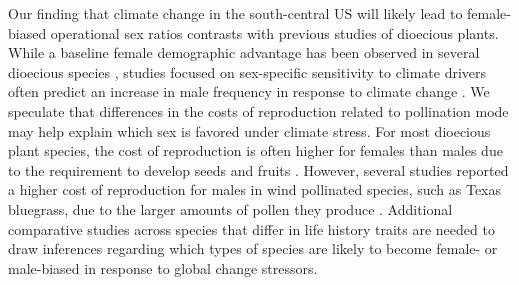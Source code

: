 \documentclass[9pt,twocolumn,twoside,lineno]{pnas-new}
\begin{document}
Our finding that climate change in the south-central US will likely lead to female-biased operational sex ratios contrasts with previous studies of dioecious plants. 
While a baseline female demographic advantage has been observed in several dioecious species \citep{bawa1980evolution,sasaki2019complex}, studies focused on sex-specific sensitivity to climate drivers often predict an increase in male frequency in response to climate change \citep{petry2016sex,hultine2016climate}. 
We speculate that differences in the costs of reproduction related to pollination mode may help explain which sex is favored under climate stress. 
For most dioecious plant species, the cost of reproduction is often higher for females than males due to the requirement to develop seeds and fruits \citep{hultine2016climate}. %
However, several studies reported a higher cost of reproduction for males in wind pollinated species, such as Texas bluegrass, due to the larger amounts of pollen they produce \citep{burli2022environmental,field2013comparative}. 
Additional comparative studies across species that differ in life history traits are needed to draw inferences regarding which types of species are likely to become female- or male-biased in response to global change stressors.
\end{document}
